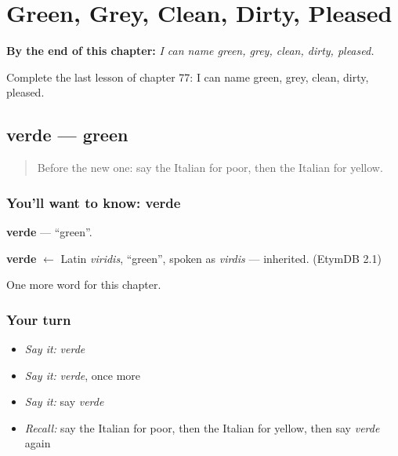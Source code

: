 
\chapter{Green, Grey, Clean, Dirty, Pleased}
\label{ch:it-green-grey-clean-dirty-pleased}

\begin{chapteropening}
\textbf{By the end of this chapter:} \emph{I can name green, grey, clean, dirty, pleased.}

Complete the last lesson of chapter 77: I can name green, grey, clean, dirty, pleased.
\end{chapteropening}

\section[verde]{verde — green}

\label{lesson:IT-C77-verde}



\begin{quote}
Before the new one: say the Italian for poor, then the Italian for yellow.
\end{quote}

\subsection*{You'll want to know: verde}
\textbf{verde} — \textquotedblleft{}green\textquotedblright{}.

\begin{cousinweb}
\textbf{verde} $\leftarrow$ Latin \emph{viridis}, \textquotedblleft{}green\textquotedblright{}, spoken as \emph{virdis} — inherited. (EtymDB 2.1)
\end{cousinweb}

\begin{grammarlens}[title={What you've built}]
One more word for this chapter.
\end{grammarlens}

\subsection*{Your turn}
\begin{itemize}
\raggedright
  \item \emph{Say it:} \emph{verde}
  \item \emph{Say it:} \emph{verde}, once more
  \item \emph{Say it:} say \emph{verde}
  \item \emph{Recall:} say the Italian for poor, then the Italian for yellow, then say \emph{verde} again
\end{itemize}

